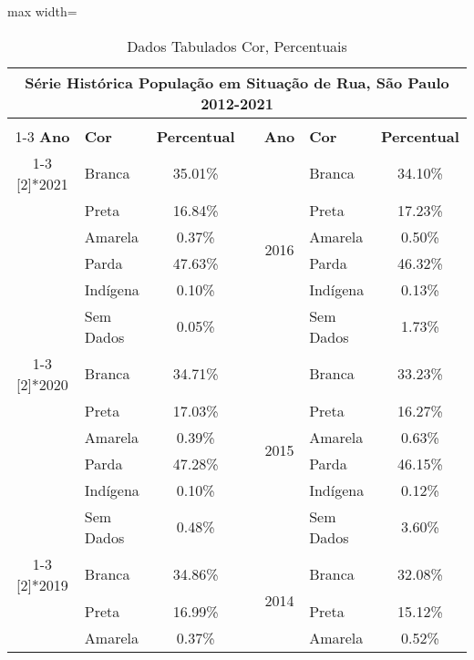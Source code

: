 \documentclass[14pt]{extarticle}
\begin{document}
\begin{table}[htbp]
  \centering
  \caption{Dados Tabulados Cor, Percentuais}
  \tabcolsep=0.15cm
	\renewcommand{\arraystretch}{1.0}
	\begin{adjustbox}{max width=\linewidth}
    \begin{tabular}{clccclc}
    \toprule
    \multicolumn{7}{c}{Série Histórica População em Situação de Rua, São Paulo 2012-2021} \\
    \midrule
         &      &      &      &      &      &  \\
\cmidrule{1-3}\cmidrule{5-7}    \rowcolor[rgb]{ .906,  .902,  .902} \textbf{Ano} & \multicolumn{1}{l}{\textbf{Cor}} & \textbf{Percentual} & \cellcolor[rgb]{ 1,  1,  1} & \textbf{Ano} & \multicolumn{1}{l}{\textbf{Cor}} & \textbf{Percentual} \\
\cmidrule{1-3}\cmidrule{5-7}    \multirow{6}[2]{*}{2021} & Branca & 35.01\% &      & \multirow{6}[2]{*}{2016} & Branca & 34.10\% \\
         & Preta & 16.84\% &      &      & Preta & 17.23\% \\
         & Amarela & 0.37\% &      &      & Amarela & 0.50\% \\
         & Parda & 47.63\% &      &      & Parda & 46.32\% \\
         & Indígena & 0.10\% &      &      & Indígena & 0.13\% \\
         & Sem Dados & 0.05\% &      &      & Sem Dados & 1.73\% \\
\cmidrule{1-3}\cmidrule{5-7}    \multirow{6}[2]{*}{2020} & Branca & 34.71\% &      & \multirow{6}[2]{*}{2015} & Branca & 33.23\% \\
         & Preta & 17.03\% &      &      & Preta & 16.27\% \\
         & Amarela & 0.39\% &      &      & Amarela & 0.63\% \\
         & Parda & 47.28\% &      &      & Parda & 46.15\% \\
         & Indígena & 0.10\% &      &      & Indígena & 0.12\% \\
         & Sem Dados & 0.48\% &      &      & Sem Dados & 3.60\% \\
\cmidrule{1-3}\cmidrule{5-7}    \multirow{6}[2]{*}{2019} & Branca & 34.86\% &      & \multirow{6}[2]{*}{2014} & Branca & 32.08\% \\
         & Preta & 16.99\% &      &      & Preta & 15.12\% \\
         & Amarela & 0.37\% &      &      & Amarela & 0.52\% \\

\end{tabular}
\end{adjustbox}
\end{table}
\end{document}
